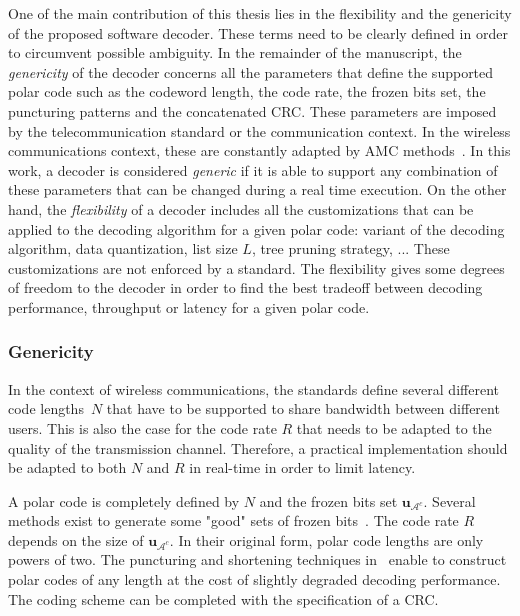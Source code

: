 One of the main contribution of this thesis lies in the flexibility and the
genericity of the proposed software decoder. These terms need to be clearly
defined in order to circumvent possible ambiguity. In the remainder of the
manuscript, the \textit{genericity} of the decoder concerns all the parameters
that define the supported polar code such as the codeword length, the code rate,
the frozen bits set, the puncturing patterns and the concatenated CRC. These
parameters are imposed by the telecommunication standard or the communication
context. In the wireless communications context, these are constantly adapted by
AMC methods~\cite{Dahlman2013}. In this work, a decoder is considered
\textit{generic} if it is able to support any combination of these parameters
that can be changed during a real time execution. On the other hand, the
\textit{flexibility} of a decoder includes all the customizations that can be
applied to the decoding algorithm for a given polar code: variant of the
decoding algorithm, data quantization, list size $L$, tree pruning strategy, ...
These customizations are not enforced by a standard. The flexibility gives some
degrees of freedom to the decoder in order to find the best tradeoff between
decoding performance, throughput or latency for a given polar code.

\subsubsection{Genericity}

In the context of wireless communications, the standards define several
different code lengths~$N$ that have to be supported to share bandwidth between
different users. This is also the case for the code rate $R$ that needs to be
adapted to the quality of the transmission channel. Therefore, a practical
implementation should be adapted to both $N$ and $R$ in real-time in order to
limit latency.

A polar code is completely defined by $N$ and the frozen bits set
$\bm{u}_{\mathcal{A}^c}$. Several methods exist to generate some "good" sets of
frozen bits~\cite{Tal2013,Trifonov2012}. The code rate $R$ depends on the size
of $\bm{u}_{\mathcal{A}^c}$. In their original form, polar code lengths are only
powers of two. The puncturing and shortening techniques
in~\cite{Wang2014,Niu2013,Miloslavskaya2015} enable to construct polar codes of
any length at the cost of slightly degraded decoding performance. The coding
scheme can be completed with the specification of a CRC.

